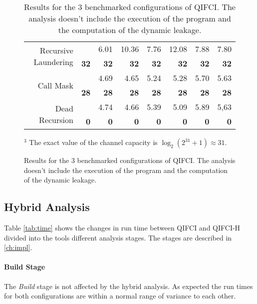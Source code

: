 \begin{figure}
\begin{table}[H]
\begin{tabular}{rr|rrrrrr}
\multirow{2}{*}{Recursive Laundering} &              & 6.01         & \multicolumn{1}{r|}{10.36}        & 7.76         & \multicolumn{1}{r|}{12.08}        & 7.88              & 7.80             \\
                                      & \textbf{32}  & \textbf{32}  & \multicolumn{1}{r|}{\textbf{32}}  & \textbf{32}  & \multicolumn{1}{r|}{\textbf{32}}  & \textbf{32}       & \textbf{32}      \\ \hline
\multirow{2}{*}{Call Mask}            &              & 4.69         & \multicolumn{1}{r|}{4.65}         & 5.24         & \multicolumn{1}{r|}{5.28}         & 5.70              & 5.63             \\
                                      & \textbf{28}  & \textbf{28}  & \multicolumn{1}{r|}{\textbf{28}}  & \textbf{28}  & \multicolumn{1}{r|}{\textbf{28}}  & \textbf{28}       & \textbf{28}      \\ \hline
\multirow{2}{*}{Dead Recursion}       &              & 4.74         & \multicolumn{1}{r|}{4.66}         & 5.39         & \multicolumn{1}{r|}{5.09}         & 5.89              & 5,63             \\
                                      & \textbf{0}   & \textbf{0}   & \multicolumn{1}{r|}{\textbf{0}}   & \textbf{0}   & \multicolumn{1}{r|}{\textbf{0}}   & \textbf{0}        & \textbf{0}       \\  
\end{tabular}
\caption{Results for the 3 benchmarked configurations of QIFCI. The analysis doesn't include the execution of the program and the computation of the dynamic leakage.}\label{tab:qifcicc}
\end{table}
{\footnotesize $^3$ The exact value of the channel capacity is $\log_2 (2^{31} + 1) \approx 31$.}
\end{figure}

\subsection{Hybrid Analysis}
Table \ref{tab:time} shows the changes in run time between QIFCI and QIFCI-H divided into the tools different analysis stages. The stages are described in \ref{ch:impl}.

\paragraph{Build Stage}
The \emph{Build} stage is not affected by the hybrid analysis. As expected the run times for both configurations are within a normal range of variance to each other.

